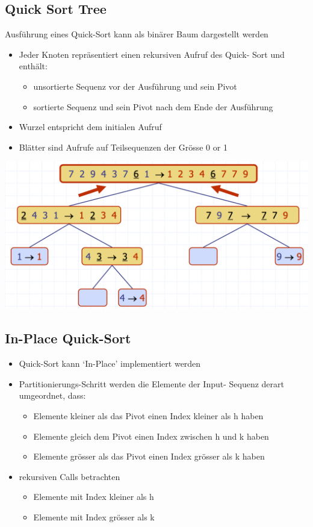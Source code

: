\subsection{Quick Sort Tree}
Ausführung eines Quick-Sort kann als binärer Baum dargestellt werden
\begin{itemize}
    \item Jeder Knoten repräsentiert einen rekursiven Aufruf des Quick- Sort und enthält:
    \begin{itemize}
        \item unsortierte Sequenz vor der Ausführung und sein Pivot
        \item sortierte Sequenz und sein Pivot nach dem Ende der Ausführung
    \end{itemize}
    \item Wurzel entspricht dem initialen Aufruf
    \item Blätter sind Aufrufe auf Teilsequenzen der Grösse 0 or 1
\end{itemize}
\vspace{-8pt}
\begin{center}
    \includegraphics[scale=.2]{graphic/05 QuickSort/Quick Sort Tree.png}
\end{center}
\vspace{-8pt}


\subsection{In-Place Quick-Sort}
\begin{itemize}
    \item Quick-Sort kann ‘In-Place’ implementiert werden
    \item Partitionierungs-Schritt werden die Elemente der Input- Sequenz derart umgeordnet, dass:
    \begin{itemize}
        \item Elemente kleiner als das Pivot einen Index kleiner als h haben
        \item Elemente gleich dem Pivot einen Index zwischen h und k haben
        \item Elemente grösser als das Pivot einen Index grösser als k haben
    \end{itemize}
    \item rekursiven Calls betrachten
    \begin{itemize}
        \item Elemente mit Index kleiner als h
        \item Elemente mit Index grösser als k
    \end{itemize}
\end{itemize}
